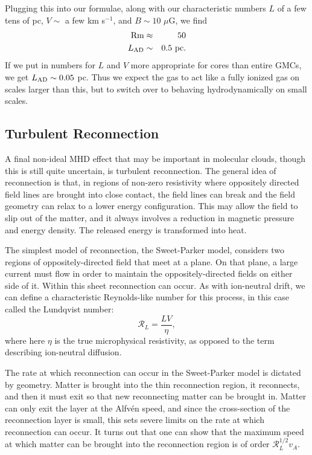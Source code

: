 Plugging this into our formulae, along with our characteristic numbers $L$ of a few tens of pc, $V\sim$ a few km s$^{-1}$, and $B\sim 10$ $\mu$G, we find
\begin{eqnarray}
\mbox{Rm} & \approx & 50 \\
L_{\rm AD}& \sim & 0.5\mbox{ pc}.
\end{eqnarray}
If we put in numbers for $L$ and $V$ more appropriate for cores than entire GMCs, we get $L_{\rm AD} \sim 0.05$ pc. Thus we expect the gas to act like a fully ionized gas on scales larger than this, but to switch over to behaving hydrodynamically on small scales.

\subsection{Turbulent Reconnection}

A final non-ideal MHD effect that may be important in molecular clouds, though this is still quite uncertain, is turbulent reconnection. The general idea of reconnection is that, in regions of non-zero resistivity where oppositely directed field lines are brought into close contact, the field lines can break and the field geometry can relax to a lower energy configuration. This may allow the field to slip out of the matter, and it always involves a reduction in magnetic pressure and energy density. The released energy is transformed into heat.

The simplest model of reconnection, the Sweet-Parker model, considers two regions of oppositely-directed field that meet at a plane. On that plane, a large current must flow in order to maintain the oppositely-directed fields on either side of it. Within this sheet reconnection can occur. As with ion-neutral drift, we can define a characteristic Reynolds-like number for this process, in this case called the Lundqvist number:
\begin{equation}
\mathcal{R}_L = \frac{LV}{\eta},
\end{equation}
where here $\eta$ is the true microphysical resistivity, as opposed to the term describing ion-neutral diffusion.

The rate at which reconnection can occur in the Sweet-Parker model is dictated by geometry. Matter is brought into the thin reconnection region, it reconnects, and then it must exit so that new reconnecting matter can be brought in. Matter can only exit the layer at the Alfv\'{e}n speed, and since the cross-section of the reconnection layer is small, this sets severe limits on the rate at which reconnection can occur. It turns out that one can show that the maximum speed at which matter can be brought into the reconnection region is of order $\mathcal{R}_L^{1/2} v_A$.

